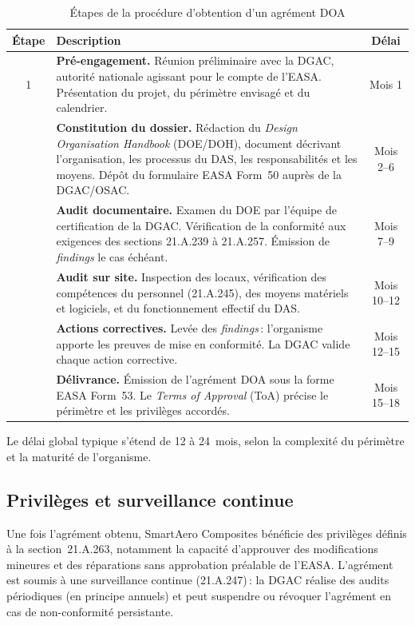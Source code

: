 \documentclass[12pt,a4paper]{article}
\begin{document}
\begin{table}[H]
\centering
\caption{Étapes de la procédure d'obtention d'un agrément DOA}
\label{tab:etapes-doa}
\small
\begin{tabularx}{\textwidth}{@{}c X c@{}}
\toprule
\textbf{Étape} & \textbf{Description} & \textbf{Délai} \\
\midrule
1 & \textbf{Pré-engagement.} Réunion préliminaire avec la DGAC, autorité nationale agissant pour le compte de l'EASA. Présentation du projet, du périmètre envisagé et du calendrier. & Mois 1 \\
\addlinespace
2 & \textbf{Constitution du dossier.} Rédaction du \textit{Design Organisation Handbook} (DOE/DOH), document décrivant l'organisation, les processus du DAS, les responsabilités et les moyens. Dépôt du formulaire EASA Form~50 auprès de la DGAC/OSAC. & Mois 2--6 \\
\addlinespace
3 & \textbf{Audit documentaire.} Examen du DOE par l'équipe de certification de la DGAC. Vérification de la conformité aux exigences des sections 21.A.239 à 21.A.257. Émission de \textit{findings} le cas échéant. & Mois 7--9 \\
\addlinespace
4 & \textbf{Audit sur site.} Inspection des locaux, vérification des compétences du personnel (21.A.245), des moyens matériels et logiciels, et du fonctionnement effectif du DAS. & Mois 10--12 \\
\addlinespace
5 & \textbf{Actions correctives.} Levée des \textit{findings}\,: l'organisme apporte les preuves de mise en conformité. La DGAC valide chaque action corrective. & Mois 12--15 \\
\addlinespace
6 & \textbf{Délivrance.} Émission de l'agrément DOA sous la forme EASA Form~53. Le \textit{Terms of Approval} (ToA) précise le périmètre et les privilèges accordés. & Mois 15--18 \\
\bottomrule
\end{tabularx}
\end{table}

Le délai global typique s'étend de 12 à 24~mois, selon la complexité du périmètre et la maturité de l'organisme.

\subsection{Privilèges et surveillance continue}

Une fois l'agrément obtenu, SmartAero Composites bénéficie des privilèges définis à la section~21.A.263, notamment la capacité d'approuver des modifications mineures et des réparations sans approbation préalable de l'EASA. L'agrément est soumis à une surveillance continue (21.A.247)\,: la DGAC réalise des audits périodiques (en principe annuels) et peut suspendre ou révoquer l'agrément en cas de non-conformité persistante.
\end{document}
